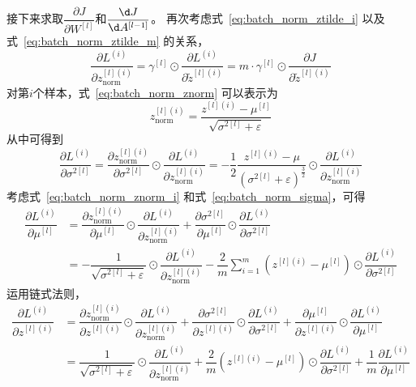 接下来求取$\dfrac{\partial J}{\partial W^{[l]}}$和$\dfrac{\d J}{\d A^{[l-1]}}$。
再次考虑式~\eqref{eq:batch_norm_ztilde_i} 以及式~\eqref{eq:batch_norm_ztilde_m} 的关系，
\begin{equation}
    \dfrac{\partial L^{(i)}}{\partial z^{[l](i)}_{\mathrm{norm}}} 
    = \gamma^{[l]} \odot \dfrac{\partial L^{(i)}}{\partial \tilde{z}^{[l](i)}}
    = m \cdot \gamma^{[l]} \odot \dfrac{\partial J}{\partial \tilde{z}^{[l](i)}}
\end{equation}
对第$i$个样本，式~\eqref{eq:batch_norm_znorm} 可以表示为
\begin{equation}
    z^{[l](i)}_{\mathrm{norm}} = \dfrac{z^{[l](i)} - \mu^{[l]}}{\sqrt{\sigma^{2[l]} + \varepsilon}}
    \label{eq:batch_norm_znorm_i}
\end{equation}
从中可得到
\begin{equation}
    \dfrac{\partial L^{(i)}}{\partial \sigma^{2[l]}} 
    = \dfrac{\partial z^{[l](i)}_{\mathrm{norm}}}{\partial \sigma^{2[l]}} \odot \dfrac{\partial L^{(i)}}{\partial z^{[l](i)}_{\mathrm{norm}}} 
    = -\dfrac{1}{2} \dfrac{z^{[l](i)} - \mu}{(\sigma^{2[l]} + \varepsilon)^{\frac{\scriptstyle 3}{\scriptstyle 2}}} \odot \dfrac{\partial L^{(i)}}{\partial z^{[l](i)}_{\mathrm{norm}}}
\end{equation}
考虑式~\eqref{eq:batch_norm_znorm_i} 和式~\eqref{eq:batch_norm_sigma}，可得
\begin{equation}
    \begin{aligned}
        \dfrac{\partial L^{(i)}}{\partial \mu^{[l]}} 
        &= \dfrac{\partial z^{[l](i)}_{\mathrm{norm}}}{\partial \mu^{[l]}} \odot \dfrac{\partial L^{(i)}}{\partial z^{[l](i)}_{\mathrm{norm}}} + \dfrac{\partial \sigma^{2[l]}}{\partial \mu^{[l]}} \odot \dfrac{\partial L^{(i)}}{\partial \sigma^{2[l]}} \\
        &= -\dfrac{1}{\sqrt{\sigma^{2[l]} + \varepsilon}} \odot \dfrac{\partial L^{(i)}}{\partial z^{[l](i)}_{\mathrm{norm}}} - \dfrac{2}{m} \sum_{i=1}^m (z^{[l](i)} - \mu^{[l]}) \odot \dfrac{\partial L^{(i)}}{\partial \sigma^{2[l]}}
    \end{aligned}
\end{equation}
运用链式法则，
\begin{equation}
    \begin{aligned}
        \dfrac{\partial L^{(i)}}{\partial z^{[l](i)}} 
        &= \dfrac{\partial z^{[l](i)}_{\mathrm{norm}}}{\partial z^{[l](i)}} \odot \dfrac{\partial L^{(i)}}{\partial z^{[l](i)}_{\mathrm{norm}}} + \dfrac{\partial \sigma^{2[l]}}{\partial z^{[l](i)}} \odot \dfrac{\partial L^{(i)}}{\partial \sigma^{2[l]}} + \dfrac{\partial \mu^{[l]}}{\partial z^{[l](i)}} \odot \dfrac{\partial L^{(i)}}{\partial \mu^{[l]}} \\
        &= \dfrac{1}{\sqrt{\sigma^{2[l]} + \varepsilon}} \odot \dfrac{\partial L^{(i)}}{\partial z^{[l](i)}_{\mathrm{norm}}} + \dfrac{2}{m} (z^{[l](i)} - \mu^{[l]}) \odot \dfrac{\partial L^{(i)}}{\partial \sigma^{2[l]}} + \dfrac{1}{m} \dfrac{\partial L^{(i)}}{\partial \mu^{[l]}}
    \end{aligned}
\end{equation}
